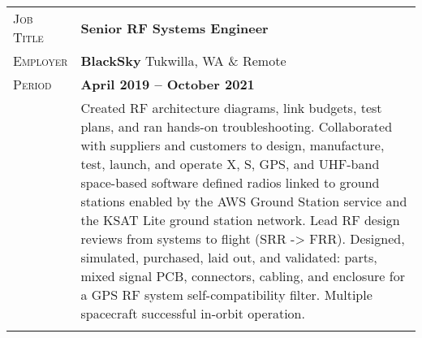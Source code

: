 \documentclass[a4paper, oneside, final]{scrartcl}
\newcommand{\gray}{\rowcolor[gray]{.90}} %
\begin{document}
\begin{center}
\begin{tabularx}{0.97\linewidth}{>{\raggedleft\scshape}p{2cm}X}
\gray Job Title & \textbf{Senior RF Systems Engineer}\\
\gray Employer & \textbf{BlackSky} \hfill Tukwilla, WA \& Remote\\
\gray Period & \textbf{April 2019 -- October 2021}\\
&
\vspace{-0.15 cm}
Created RF architecture diagrams, link budgets, test plans, and ran hands-on troubleshooting. Collaborated with suppliers and customers to design, manufacture, test, launch, and operate X, S, GPS, and UHF-band space-based software defined radios linked to ground stations enabled by the AWS Ground Station service and the KSAT Lite ground station network.  Lead RF design reviews from systems to flight (SRR -> FRR).
\newline
\newline
Designed, simulated, purchased, laid out, and validated: parts, mixed signal PCB, connectors, cabling, and enclosure for a GPS RF system self-compatibility filter.  Multiple spacecraft successful in-orbit operation.
\\
\\
\end{tabularx}


\end{center}
\end{document}
